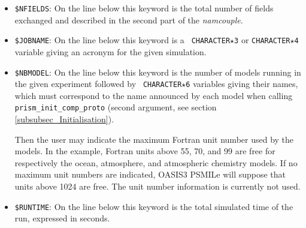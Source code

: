 \begin{itemize}
%

\item {\tt \$NFIELDS}: On the line below this keyword is the total
number of fields exchanged and described in the second part of
the {\it namcouple}. 

\item {\tt \$JOBNAME}: On the line below this keyword is a {\tt
CHARACTER$\star$3} or {\tt CHARACTER$\star$4} variable giving an
acronym for the given simulation.

\item {\tt \$NBMODEL}: On the line below this keyword is the number of
models running in the given experiment followed by {\tt
CHARACTER$\star$6} variables giving their names, which must correspond to the name announced by each model when calling {\tt prism\_init\_comp\_proto} (second argument, see section \ref{subsubsec_Initialisation}). 

Then the user may
indicate the maximum Fortran unit number used by the models. In  the
example, Fortran units above 55, 70, and 99 are free for respectively
the ocean, atmosphere, and atmospheric chemistry models. If no
maximum unit numbers are indicated, OASIS3 PSMILe will suppose that units
above 1024 are free.  The unit number information is currently not used.

\item {\tt \$RUNTIME}: On the line below this keyword is the total
simulated time of the run, expressed in seconds. 


\end{itemize}
